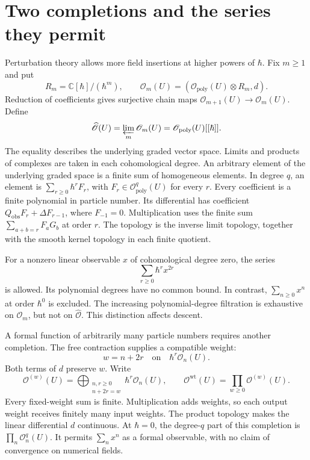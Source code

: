 \section{Two completions and the series they permit}
\label{sec:clo-completions}

Perturbation theory allows more field insertions at higher powers of
$\hbar$. Fix $m\geq1$ and put
\[
 R_m=\mathbb C[\hbar]/(\hbar^m),\qquad
 \mathscr O_m(U)=
 (\mathscr O_{\mathrm{poly}}(U)\otimes R_m,d).
\]
Reduction of coefficients gives surjective chain maps
$\mathscr O_{m+1}(U)\to\mathscr O_m(U)$.
Define
\begin{equation}\label{eq:clo-hbar-completion}
 \widehat{\mathscr O}(U)=\varprojlim_m\mathscr O_m(U)
 =\mathscr O_{\mathrm{poly}}(U)[[\hbar]].
\end{equation}
The equality describes the underlying graded vector space.
Limits and products of complexes are taken in each cohomological degree.
An arbitrary element of the underlying graded space is a finite sum
of homogeneous elements.
In degree $q$, an element is $\sum_{r\geq0}\hbar^r F_r$, with
$F_r\in\mathscr O_{\mathrm{poly}}^q(U)$ for every $r$.
Every coefficient is a finite polynomial in particle number.
Its differential has coefficient
$Q_{\mathrm{obs}}F_r+\Delta F_{r-1}$, where $F_{-1}=0$.
Multiplication uses the finite sum $\sum_{a+b=r}F_aG_b$ at order $r$.
The topology is the inverse limit topology, together with the smooth
kernel topology in each finite quotient.

For a nonzero linear observable $x$ of cohomological degree zero, the series
\[
 \sum_{r\geq0}\hbar^r x^{2r}
\]
is allowed. Its polynomial degrees have no common bound.
In contrast, $\sum_{n\geq0}x^n$ at order $\hbar^0$ is excluded.
The increasing polynomial-degree filtration is exhaustive on
$\mathscr O_m$, but not on $\widehat{\mathscr O}$.
This distinction affects descent.

A formal function of arbitrarily many particle numbers requires another
completion. The free contraction supplies a compatible weight:
\[
 w=n+2r\quad\text{on}\quad \hbar^r\mathscr O_n(U).
\]
Both terms of $d$ preserve $w$.
Write
\[
 \mathscr O^{(w)}(U)=
 \bigoplus_{\substack{n,r\geq0\\n+2r=w}}
       \hbar^r\mathscr O_n(U),
 \qquad
 \mathscr O^{\mathrm{wt}}(U)=\prod_{w\geq0}\mathscr O^{(w)}(U).
\]
Every fixed-weight sum is finite. Multiplication adds weights, so each
output weight receives finitely many input weights.
The product topology makes the linear differential $d$ continuous.
At $\hbar=0$, the degree-$q$ part of this completion is
$\prod_n\mathscr O_n^q(U)$.
It permits $\sum_n x^n$ as a formal observable, with no claim of
convergence on numerical fields.

